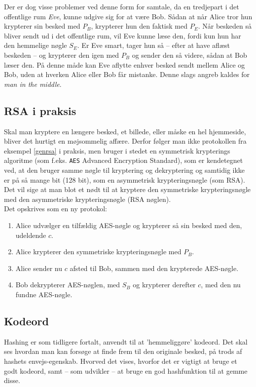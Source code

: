 Der er dog visse problemer ved denne form for samtale, da en tredjepart i det offentlige rum \emph{Eve}, kunne udgive sig for at være Bob.
Sådan at når Alice tror hun krypterer sin besked med \(P_B\), krypterer hun den faktisk med \(P_E\).
Når beskeden så bliver sendt ud i det offentlige rum, vil Eve kunne læse den, fordi kun hun har den hemmelige nøgle \(S_E\).
Er Eve smart, tager hun så -- efter at have aflæst beskeden -- og krypterer den igen med \(P_B\) og sender den så videre, sådan at Bob læser den.
På denne måde kan Eve aflytte enhver besked sendt mellem Alice og Bob, uden at hverken Alice eller Bob får mistanke.
Denne slags angreb kaldes for \emph{man in the middle}. \cite{ytmitm}


\subsection{RSA i praksis}
Skal man kryptere en længere besked, et billede, eller måske en hel hjemmeside, bliver det hurtigt en møjsommelig affære.
Derfor følger man ikke protokollen fra eksempel \ref{genrsa} i praksis, men bruger i stedet en symmetrisk krypterings algoritme (som f.eks. \texttt{AES} Advanced Encryption Standard), som er kendetegnet ved, at den bruger samme nøgle til kryptering og dekryptering og samtidig ikke er på så mange bit (128 bit), som en asymmetrisk krypteringsnøgle (som RSA). \cite{algoritmer}
Det vil sige at man blot et nødt til at kryptere den symmetriske krypteringsnøgle med den asymmetriske krypteringsnøgle (RSA nøglen). \cite[112]{krypto}\\
Det opskrives som en ny protokol:

\begin{enumerate}[label*=(\arabic*)]
    \item Alice udvælger en tilfældig AES-nøgle og krypterer så sin besked med den, udeldende \(c\).
    \item Alice krypterer den symmetriske krypteringsnøgle med \(P_B\).
    \item Alice sender nu \(c\) afsted til Bob, sammen med den krypterede AES-nøgle.
    \item Bob dekrypterer AES-nøglen, med \(S_B\) og krypterer derefter \(c\), med den nu fundne AES-nøgle.
\end{enumerate}




\subsection{Kodeord}\label{kodeord}
Hashing er som tidligere fortalt, anvendt til at 'hemmeliggøre' kodeord.
Det skal ses hvordan man kan forsøge at finde frem til den originale besked, på trods af hashets envejs-egenskab.
Hvorved det vises, hvorfor det er vigtigt at bruge et godt kodeord, samt -- som udvikler -- at bruge en god hashfunktion til at gemme disse.


